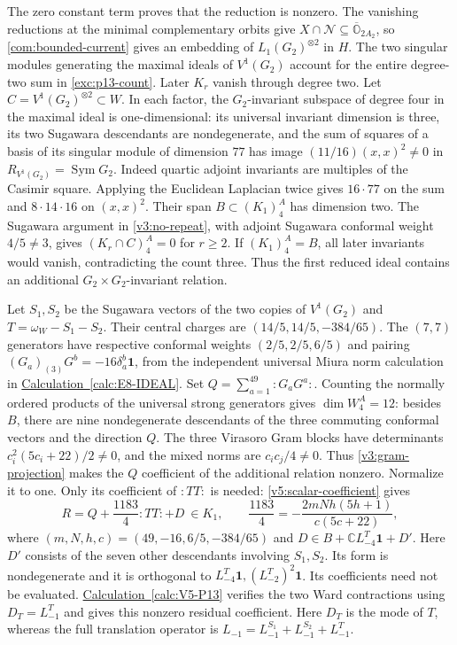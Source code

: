 \documentclass[11pt,a4paper]{amsart}
\numberwithin{equation}{section}
\theoremstyle{definition}
\theoremstyle{remark}
\newcommand{\C}{\mathbb C}
\newcommand{\N}{\mathcal N}
\newcommand{\OO}{\mathbb O}
\newcommand{\Sym}{\operatorname{Sym}}
\begin{document}
The zero constant term proves that the reduction is nonzero. The
vanishing reductions at the minimal complementary orbits give $X\cap\N\subseteq\overline{\OO}_{2A_2}$, so \cref{com:bounded-current} gives an embedding of
$L_1(G_2)^{\otimes2}$ in $H$. The two singular modules generating the maximal ideals of
$V^1(G_2)$ account for the entire
degree-two sum in \eqref{exc:p13-count}. Later $K_r$ vanish through degree
two. Let $C=V^1(G_2)^{\otimes2}\subset W$. In each factor, the $G_2$-invariant subspace of degree four in the
maximal ideal is one-dimensional: its universal invariant dimension
is three, its two Sugawara descendants are nondegenerate, and the sum of
squares of a basis of its singular module of dimension $77$ has image
$(11/16)(x,x)^2\ne0$ in $R_{V^1(G_2)}=\Sym G_2$. Indeed quartic adjoint invariants are multiples
of the Casimir square. Applying the Euclidean Laplacian twice gives
$16\cdot77$ on the sum and $8\cdot14\cdot16$ on $(x,x)^2$.
Their span $B\subset(K_1)_4^A$ has dimension two.
The Sugawara argument in \cref{v3:no-repeat}, with adjoint Sugawara conformal weight $4/5\ne3$, gives $(K_r\cap C)_4^A=0$ for $r\ge2$. If $(K_1)_4^A=B$,
all later invariants would vanish, contradicting the count three.
Thus the first reduced ideal contains an additional
$G_2\times G_2$-invariant relation.

Let $S_1,S_2$ be the Sugawara vectors of the two copies of $V^1(G_2)$ and $T=\omega_W-S_1-S_2$.
Their central charges are $(14/5,14/5,-384/65)$. The $(7,7)$ generators have
respective conformal weights $(2/5,2/5,6/5)$ and pairing
$(G_a)_{(3)}G^b=-16\delta_a^b\mathbf1$, from the
independent universal Miura norm calculation in
\hyperref[calc:E8-IDEAL]{Calculation~\ref*{calc:E8-IDEAL}}. Set $Q=\sum_{a=1}^{49}:G_aG^a:$.
Counting the normally ordered products of the universal strong
generators gives $\dim W_4^A=12$: besides $B$, there are nine nondegenerate
descendants of the three commuting conformal vectors and the direction $Q$.
The three Virasoro Gram blocks have determinants
$c_i^2(5c_i+22)/2\ne0$, and the mixed norms are $c_ic_j/4\ne0$.
Thus \cref{v3:gram-projection} makes the $Q$ coefficient of the
additional relation nonzero. Normalize it to one. Only its
coefficient of $:TT:$ is needed: \cref{v5:scalar-coefficient} gives
\begin{equation}\label{exc:p13-relation}
 R=Q+\frac{1183}{4}:TT:+D\ \in K_1,\qquad
 \frac{1183}{4}=-\frac{2mNh(5h+1)}{c(5c+22)},
\end{equation}
where $(m,N,h,c)=(49,-16,6/5,-384/65)$ and
$D\in B+\C L_{-4}^T\mathbf1+D'$. Here $D'$ consists of the seven
other descendants involving $S_1,S_2$. Its form is nondegenerate and
it is orthogonal to $L_{-4}^T\mathbf1,(L_{-2}^T)^2\mathbf1$. Its
coefficients need not be evaluated. \hyperref[calc:V5-P13]{Calculation~\ref*{calc:V5-P13}} verifies the
two Ward contractions using $D_T=L^T_{-1}$ and gives this nonzero
residual coefficient. Here $D_T$ is the mode of $T$, whereas the full
translation operator is
$L_{-1}=L^{S_1}_{-1}+L^{S_2}_{-1}+L^T_{-1}$.
\end{document}
